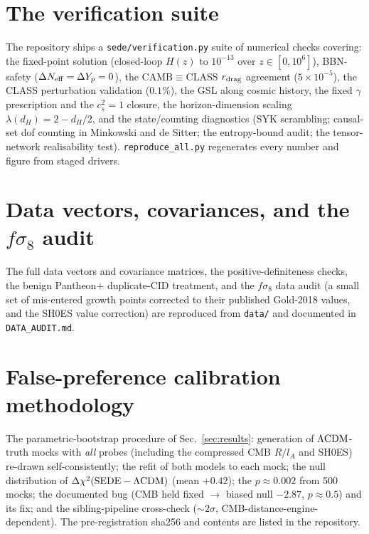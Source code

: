 \section{The verification suite}\label{app:suite}
The repository ships a \texttt{sede/verification.py} suite of numerical checks covering: the fixed-point
solution (closed-loop $H(z)$ to $10^{-13}$ over $z\in[0,10^6]$), BBN-safety ($\Delta N_{\rm
eff}=\Delta Y_p=0$), the CAMB$\equiv$CLASS $r_{\rm drag}$ agreement ($5\times10^{-5}$), the CLASS
perturbation validation ($0.1\%$), the GSL along cosmic history, the fixed $\gamma$ prescription and the
$c_s^2=1$ closure, the horizon-dimension scaling $\lambda(d_H)=2-d_H/2$, and the state/counting
diagnostics (SYK scrambling; causal-set dof counting in Minkowski and de Sitter; the entropy-bound
audit; the tensor-network realisability test). \texttt{reproduce\_all.py} regenerates every number and
figure from staged drivers.

\section{Data vectors, covariances, and the $f\sigma_8$ audit}\label{app:data}
The full data vectors and covariance matrices, the positive-definiteness checks, the benign Pantheon$+$
duplicate-CID treatment, and the $f\sigma_8$ data audit (a small set of mis-entered growth points
corrected to their published Gold-2018 values, and the SH0ES value correction) are reproduced from
\texttt{data/} and documented in \texttt{DATA\_AUDIT.md}.

\section{False-preference calibration methodology}\label{app:calib}
The parametric-bootstrap procedure of Sec.~\ref{sec:results}: generation of $\Lambda\mathrm{CDM}$-truth mocks with
\emph{all} probes (including the compressed CMB $R/l_A$ and SH0ES) re-drawn self-consistently; the refit
of both models to each mock; the null distribution of $\Delta\chi^2(\mathrm{SEDE}-\Lambda\mathrm{CDM})$ (mean $+0.42$);
the $p\approx0.002$ from 500 mocks; the documented bug (CMB held fixed $\to$ biased null $-2.87$,
$p\approx0.5$) and its fix; and the sibling-pipeline cross-check ($\sim2\sigma$,
CMB-distance-engine-dependent). The pre-registration sha256 and contents are listed in the repository.


